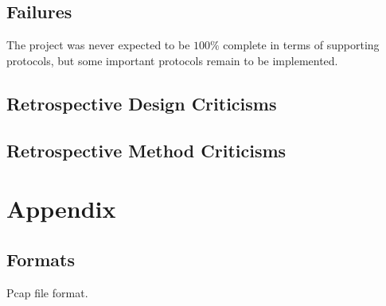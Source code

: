 \documentclass[10pt,a4paper,notitlepage]{report}
\begin{document}
\section{Failures}
The project was never expected to be $100\%$ complete in terms of supporting protocols, but some important protocols remain to be implemented.

\section{Retrospective Design Criticisms}

\section{Retrospective Method Criticisms}


\chapter{Appendix}
\section{Formats}
Pcap file format.


\end{document}
